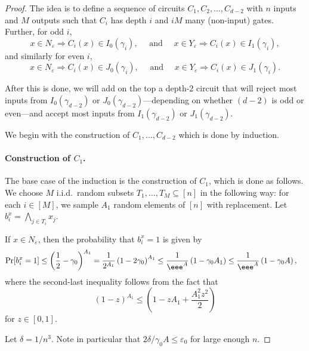 \documentclass{toc}
\newcommand{\prob}[2]{\mathop{\mathrm{Pr}}_{#1}[#2]}
\begin{document}
\begin{proof}
The idea is to define a sequence of circuits $C_1,C_2,\ldots,C_{d-2}$ with $n$ inputs and $M$ outputs such that $C_i$ has depth $i$ and $iM$ many (non-input) gates. Further, for odd $i$, 
\begin{equation}
x\in N_\varepsilon \Rightarrow C_i(x)\in I_0(\gamma_i),\quad\text{ and }\quad
x\in Y_\varepsilon \Rightarrow C_i(x)\in I_1(\gamma_i),\label{eq:oddi}
\end{equation}
and similarly for even $i$,
\begin{equation}
x\in N_\varepsilon \Rightarrow C_i(x)\in J_0(\gamma_i),\quad\text{ and }\quad
x\in Y_\varepsilon \Rightarrow C_i(x)\in J_1(\gamma_i).\label{eq:eveni}
\end{equation}

After this is done, we will add on
the %
top a depth-$2$ circuit that will reject most inputs from $I_0(\gamma_{d-2})$
or $J_0(\gamma_{d-2})$---depending on whether
%
%
%
$(d-2)$ is odd or even---and accept most inputs from $I_1(\gamma_{d-2})$ or $J_1(\gamma_{d-2})$. 

We begin with the construction of $C_1,\ldots,C_{d-2}$ which is done by induction. 

\paragraph{Construction of $C_1$.} The base case of the induction is the construction of $C_1$, which is done as follows. We choose $M$ i.i.d.\ random subsets $T_1,\ldots,T_M\subseteq [n]$ in the following way: for each $i\in [M]$, we sample $A_1$ random elements of $[n]$ with replacement. Let $b_i^x = \bigwedge_{j\in T_i}x_j$.

If $x\in N_\varepsilon$, then the probability that $b_i^x = 1$ is given by 
\begin{align*}
\prob{}{b_i^x = 1} &\le \left(\frac{1}{2}- \gamma_0\right)^{A_1}
= \frac{1}{2^{A_1}} \left(1-2\gamma_0\right)^{A_1} \leq \frac{1}{\eee^A}\left(1 -\gamma_0A_1 \right) \leq \frac{1}{\eee^A}\left(1 -\gamma_0A\right),
\end{align*}
where the second-last inequality follows from the fact that
\[
  (1-z)^{A_1} \leq \left(1-zA_1 + \frac{A_1^2z^2}{2}\right)
\]
for $z\in [0,1]$.

Let $\delta = 1/n^3$. Note in particular that $2\delta/\gamma_0A \leq \varepsilon_0$ for large enough $n$.


\end{proof}
\end{document}
